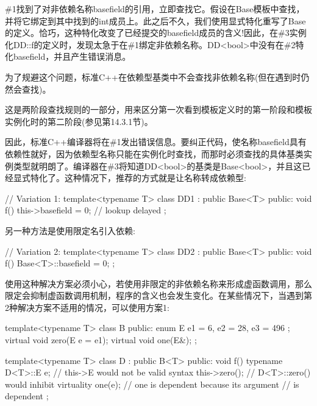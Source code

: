 
\#1找到了对非依赖名称basefield的引用，立即查找它。假设在Base模板中查找，并将它绑定到其中找到的int成员上。此之后不久，我们使用显式特化重写了Base的定义。恰巧，这种特化改变了已经提交的basefield成员的含义!因此，在\#3实例化DD::f的定义时，发现太急于在\#1绑定非依赖名称。DD<bool>中没有在\#2特化basefield，并且产生错误消息。

为了规避这个问题，标准C++在依赖型基类中不会查找非依赖名称(但在遇到时仍然会查找)。

\begin{notice}
这是两阶段查找规则的一部分，用来区分第一次看到模板定义时的第一阶段和模板实例化时的第二阶段(参见第14.3.1节)。
\end{notice}

因此，标准C++编译器将在\#1发出错误信息。要纠正代码，使名称basefield具有依赖性就好，因为依赖型名称只能在实例化时查找，而那时必须查找的具体基类实例类型就明朗了。编译器在\#3将知道DD<bool>的基类是Base<bool>，并且这已经显式特化了。这种情况下，推荐的方式就是让名称转成依赖型:

\begin{cpp}
// Variation 1:
template<typename T>
class DD1 : public Base<T> {
	public:
	void f() { this->basefield = 0; } // lookup delayed
};
\end{cpp}

另一种方法是使用限定名引入依赖:

\begin{cpp}
// Variation 2:
template<typename T>
class DD2 : public Base<T> {
	public:
	void f() { Base<T>::basefield = 0; }
};
\end{cpp}

使用这种解决方案必须小心，若使用非限定的非依赖名称来形成虚函数调用，那么限定会抑制虚函数调用机制，程序的含义也会发生变化。在某些情况下，当遇到第2种解决方案不适用的情况，可以使用方案1:

\begin{cpp}
template<typename T>
class B {
	public:
	enum E { e1 = 6, e2 = 28, e3 = 496 };
	virtual void zero(E e = e1);
	virtual void one(E&);
};

template<typename T>
class D : public B<T> {
	public:
	void f() {
		typename D<T>::E e; // this->E would not be valid syntax
		this->zero(); // D<T>::zero() would inhibit virtuality
		one(e); // one is dependent because its argument
	} // is dependent
};
\end{cpp}

